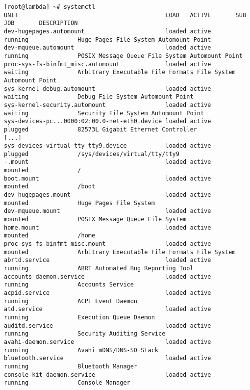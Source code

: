 \documentclass[10pt,oneside,a4paper]{article}
\begin{document}
\begin{landscape}
\begin{Verbatim}[fontsize=\small]
[root@lambda] ~# systemctl
UNIT                                          LOAD   ACTIVE       SUB        JOB       DESCRIPTION
dev-hugepages.automount                       loaded active       running              Huge Pages File System Automount Point
dev-mqueue.automount                          loaded active       running              POSIX Message Queue File System Automount Point
proc-sys-fs-binfmt_misc.automount             loaded active       waiting              Arbitrary Executable File Formats File System Automount Point
sys-kernel-debug.automount                    loaded active       waiting              Debug File System Automount Point
sys-kernel-security.automount                 loaded active       waiting              Security File System Automount Point
sys-devices-pc...0000:02:00.0-net-eth0.device loaded active       plugged              82573L Gigabit Ethernet Controller
[...]
sys-devices-virtual-tty-tty9.device           loaded active       plugged              /sys/devices/virtual/tty/tty9
-.mount                                       loaded active       mounted              /
boot.mount                                    loaded active       mounted              /boot
dev-hugepages.mount                           loaded active       mounted              Huge Pages File System
dev-mqueue.mount                              loaded active       mounted              POSIX Message Queue File System
home.mount                                    loaded active       mounted              /home
proc-sys-fs-binfmt_misc.mount                 loaded active       mounted              Arbitrary Executable File Formats File System
abrtd.service                                 loaded active       running              ABRT Automated Bug Reporting Tool
accounts-daemon.service                       loaded active       running              Accounts Service
acpid.service                                 loaded active       running              ACPI Event Daemon
atd.service                                   loaded active       running              Execution Queue Daemon
auditd.service                                loaded active       running              Security Auditing Service
avahi-daemon.service                          loaded active       running              Avahi mDNS/DNS-SD Stack
bluetooth.service                             loaded active       running              Bluetooth Manager
console-kit-daemon.service                    loaded active       running              Console Manager

\end{Verbatim}
\end{landscape}
\end{document}

